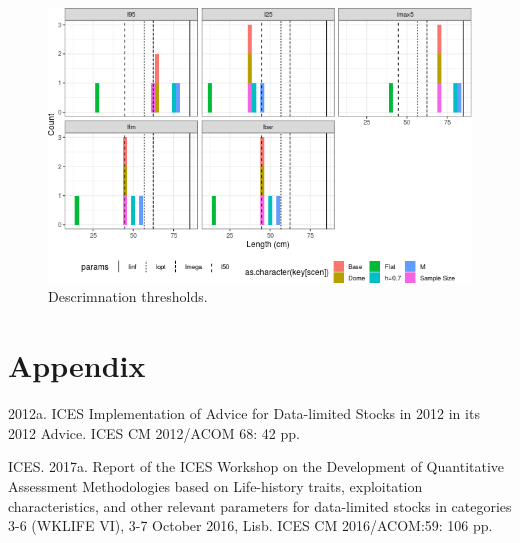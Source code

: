 \documentclass[12pt,doublespacing,a4paper]{ouparticle}
\begin{document}
\newpage
\begin{figure}[h]
\centering
\includegraphics[width=\textwidth]{roc-overfish-ref-pollack-1.png}
\caption{Descrimnation thresholds.}
\label{fig:discrim}
\end{figure}

\clearpage
\section{Appendix}


2012a. ICES Implementation of Advice for Data-limited Stocks in 2012 in its 2012 Advice. ICES CM 2012/ACOM 68: 42 pp.

ICES. 2017a. Report of the ICES Workshop on the Development of Quantitative Assessment Methodologies based on Life-history traits, exploitation characteristics, and other relevant parameters for data-limited stocks in categories 3-6 (WKLIFE VI), 3-7 October 2016, Lisb. ICES CM 2016/ACOM:59: 106 pp.
\end{document}
